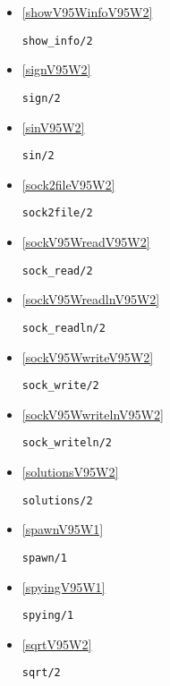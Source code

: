\begin{itemize}
\item \ref{showV95WinfoV95W2} 
\begin{verbatim}
show_info/2
\end{verbatim}

\item \ref{signV95W2} 
\begin{verbatim}
sign/2
\end{verbatim}

\item \ref{sinV95W2} 
\begin{verbatim}
sin/2
\end{verbatim}

\item \ref{sock2fileV95W2} 
\begin{verbatim}
sock2file/2
\end{verbatim}

\item \ref{sockV95WreadV95W2} 
\begin{verbatim}
sock_read/2
\end{verbatim}

\item \ref{sockV95WreadlnV95W2} 
\begin{verbatim}
sock_readln/2
\end{verbatim}

\item \ref{sockV95WwriteV95W2} 
\begin{verbatim}
sock_write/2
\end{verbatim}

\item \ref{sockV95WwritelnV95W2} 
\begin{verbatim}
sock_writeln/2
\end{verbatim}

\item \ref{solutionsV95W2} 
\begin{verbatim}
solutions/2
\end{verbatim}

\item \ref{spawnV95W1} 
\begin{verbatim}
spawn/1
\end{verbatim}

\item \ref{spyingV95W1} 
\begin{verbatim}
spying/1
\end{verbatim}

\item \ref{sqrtV95W2} 
\begin{verbatim}
sqrt/2
\end{verbatim}


\end{itemize}
